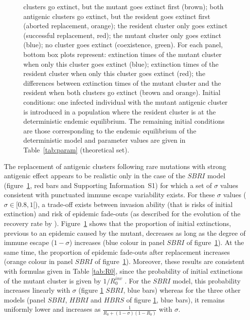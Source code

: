 \begin{figure}[!htbp]
{          clusters go extinct, but the mutant goes extinct first
          (brown); both antigenic clusters go extinct, but the
          resident goes extinct first (aborted replacement, orange);
          the resident cluster only goes extinct (successful
          replacement, red); the mutant cluster only goes extinct
          (blue); no cluster goes extinct (coexistence, green). For
          each panel, bottom box plots represent: extinction times of
          the mutant cluster when only this cluster goes extinct
          (blue); extinction times of the resident cluster when only
          this cluster goes extinct (red); the differences between
          extinction times of the mutant cluster and the resident when
          both clusters go extinct (brown and orange). Initial
          conditions: one infected individual with the mutant
          antigenic cluster is introduced in a population where the
          resident cluster is at the deterministic endemic
          equilibrium. The remaining initial conditions are those
          corresponding to the endemic equilibrium of the
          deterministic model and parameter values are given in
          Table~\ref{tab:param} (theoretical set).}
\label{fig:replace}
\end{figure}



The replacement of antigenic clusters following rare mutations with
strong antigenic effect appears to be realistic only in the case of
the $SBRI$ model (figure~\ref{fig:replace}, red bars and Supporting
Information~S1) for which a set of $\sigma$ values consistent with
punctuated immune escape variability exists. For these $\sigma$ values
($\sigma \in [0.8,1[$), a trade-off exists between invasion ability
(that is risks of initial extinction) and risk of epidemic fade-outs
(as described for the evolution of the recovery rate by
\citet{Keeling2000}).  Figure~\ref{fig:replace} shows that the
proportion of initial extinctions, previous to an epidemic caused by
the mutant, decreases as long as the degree of immune escape
($1-\sigma$) increases (blue colour in panel $SBRI$ of
figure~\ref{fig:replace}). At the same time, the proportion of
epidemic fade-outs after replacement increases (orange colour in panel
$SBRI$ of figure~\ref{fig:replace}). Moreover, these results are
consistent with formulas given in Table \ref{tab:R0}, since the
probability of initial extinctions of the mutant cluster is given by
$1/R_0^{inv}$ \citep{Diekmann2000}. For the $SBRI$ model, this
probability increases linearly with $\sigma$ (figure \ref{fig:replace}
$SBRI$, blue bars) whereas for the three other models (panel $SBRI$,
$HBRI$ and $HBRS$ of figure \ref{fig:replace}, blue bars), it remains
uniformly lower and increases as $\frac{1}{R_0+(1-\sigma) (1-R_0)}$
with $\sigma$.

